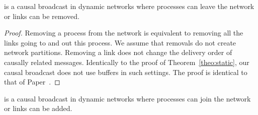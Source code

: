 \begin{lemma}
  \CBROADCAST is a causal broadcast in dynamic networks where processes can
  leave the network or links can be removed.
\end{lemma}

\begin{proof}
  Removing a process from the network is equivalent to removing all the links
  going to and out this process. We assume that removals do not create network
  partitions.  Removing a link does not change the delivery order of causally
  related messages. Identically to the proof of Theorem~\ref{theo:static}, our
  causal broadcast does not use buffers in such settings. The proof is identical
  to that of Paper~\cite{friedman2004causal}.
\end{proof}

\begin{lemma}
  \CBROADCAST is a causal broadcast in dynamic networks where processes can join
  the network or links can be added.
\end{lemma}

